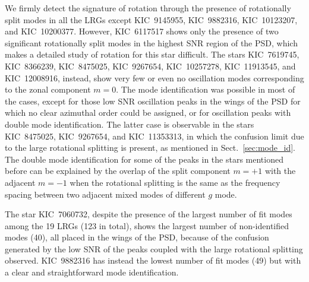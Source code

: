 \documentclass[structabstract]{aa}
\newcommand{\kic}{KIC~12008916}
\begin{document}
We firmly detect the signature of rotation through the presence of rotationally split modes in all the LRGs except KIC~9145955, KIC~9882316, KIC~10123207, and KIC~10200377. However, KIC~6117517 shows only the presence of two significant rotationally split modes in the highest SNR region of the PSD, which makes a detailed study of rotation for this star difficult. The stars KIC~7619745, KIC~8366239, KIC~8475025, KIC~9267654, KIC~10257278, KIC~11913545, and \kic, instead, show very few or even no oscillation modes corresponding to the zonal component $m=0$. The mode identification was possible in most of the cases, except for those low SNR oscillation peaks in the wings of the PSD for which no clear azimuthal order could be assigned, or for oscillation peaks with double mode identification. The latter case is observable in the stars KIC~8475025, KIC~9267654, and KIC~11353313, in which the confusion limit due to the large rotational splitting is present, as mentioned in Sect.~\ref{sec:mode_id}. The double mode identification for some of the peaks in the stars mentioned before can be explained by the overlap of the split component $m = +1$ with the adjacent $m = -1$ when the rotational splitting is the same as the frequency spacing between two adjacent mixed modes of different $g$ mode. 

The star KIC~7060732, despite the presence of the largest number of fit modes among the 19 LRGs (123 in total), shows the largest number of non-identified modes (40), all placed in the wings of the PSD, because of the confusion generated by the low SNR of the peaks coupled with the large rotational splitting observed. KIC~9882316 has instead the lowest number of fit modes (49) but with a clear and straightforward mode identification.
\end{document}
